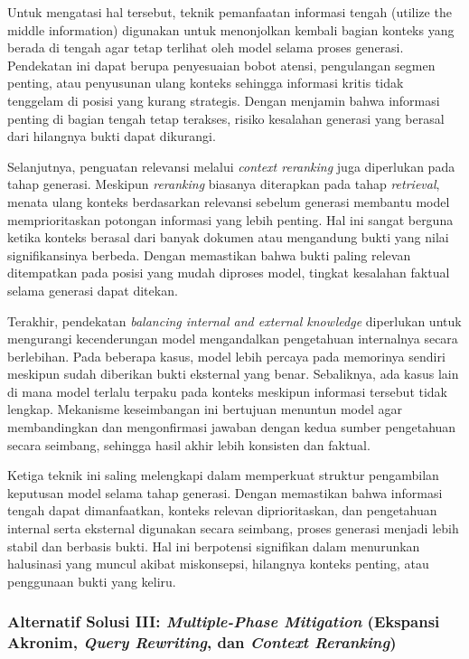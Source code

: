 Untuk mengatasi hal tersebut, teknik pemanfaatan informasi tengah (utilize the middle information) digunakan untuk menonjolkan kembali bagian konteks yang berada di tengah agar tetap terlihat oleh model selama proses generasi. Pendekatan ini dapat berupa penyesuaian bobot atensi, pengulangan segmen penting, atau penyusunan ulang konteks sehingga informasi kritis tidak tenggelam di posisi yang kurang strategis. Dengan menjamin bahwa informasi penting di bagian tengah tetap terakses, risiko kesalahan generasi yang berasal dari hilangnya bukti dapat dikurangi.

Selanjutnya, penguatan relevansi melalui \textit{context reranking} juga diperlukan pada tahap generasi. Meskipun \textit{reranking} biasanya diterapkan pada tahap \textit{retrieval}, menata ulang konteks berdasarkan relevansi sebelum generasi membantu model memprioritaskan potongan informasi yang lebih penting. Hal ini sangat berguna ketika konteks berasal dari banyak dokumen atau mengandung bukti yang nilai signifikansinya berbeda. Dengan memastikan bahwa bukti paling relevan ditempatkan pada posisi yang mudah diproses model, tingkat kesalahan faktual selama generasi dapat ditekan.

Terakhir, pendekatan \textit{balancing internal and external knowledge} diperlukan untuk mengurangi kecenderungan model mengandalkan pengetahuan internalnya secara berlebihan. Pada beberapa kasus, model lebih percaya pada memorinya sendiri meskipun sudah diberikan bukti eksternal yang benar. Sebaliknya, ada kasus lain di mana model terlalu terpaku pada konteks meskipun informasi tersebut tidak lengkap. Mekanisme keseimbangan ini bertujuan menuntun model agar membandingkan dan mengonfirmasi jawaban dengan kedua sumber pengetahuan secara seimbang, sehingga hasil akhir lebih konsisten dan faktual.

Ketiga teknik ini saling melengkapi dalam memperkuat struktur pengambilan keputusan model selama tahap generasi. Dengan memastikan bahwa informasi tengah dapat dimanfaatkan, konteks relevan diprioritaskan, dan pengetahuan internal serta eksternal digunakan secara seimbang, proses generasi menjadi lebih stabil dan berbasis bukti. Hal ini berpotensi signifikan dalam menurunkan halusinasi yang muncul akibat miskonsepsi, hilangnya konteks penting, atau penggunaan bukti yang keliru.

\subsubsection{Alternatif Solusi III: \textit{Multiple-Phase Mitigation} (Ekspansi Akronim, \textit{Query Rewriting}, dan \textit{Context Reranking})}


